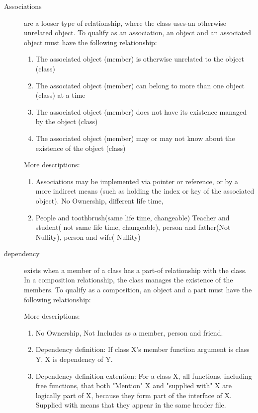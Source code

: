 \documentclass[a4paper,11pt,twoside]{book}
\begin{document}
\begin{itemize}
\begin{description}
	\item[Associations  ] are a looser type of relationship, where the class uses-an otherwise unrelated object. To qualify as an association, an object and an associated object must have the following relationship:
	\begin{enumerate}
		\item The associated object (member) is otherwise unrelated to the object (class)
		\item The associated object (member) can belong to more than one object (class) at a time
		\item The associated object (member) does not have its existence managed by the object (class)
		\item The associated object (member) may or may not know about the existence of the object (class)
	\end{enumerate}
	More descriptions:
	\begin{enumerate}
		\item Associations may be implemented via pointer or reference, or by a more indirect means (such as holding the index or key of the associated object). No Ownership, different life time,
		
		\item People and toothbrush(same life time, changeable) Teacher and student( not same life time, changeable), person and father(Not Nullity), person and wife( Nullity)
	\end{enumerate}

	\item[dependency ] exists when a member of a class has a part-of relationship with the class. In a composition relationship, the class manages the existence of the members. To qualify as a composition, an object and a part must have the following relationship:
	
	More descriptions:
	\begin{enumerate}
		\item No Ownership, Not Includes as a member, person and friend.
		
		\item Dependency definition: If class X's member function argument is class Y, X is dependency of Y.
		
		\item Dependency definition extention: For a class X, all functions, including free functions, that both "Mention" X and "supplied with" X are logically part of X, because they form part of the interface of X. Supplied with means that they appear in the same header file.
	\end{enumerate}
	


\end{description}
\end{itemize}
\end{document}
